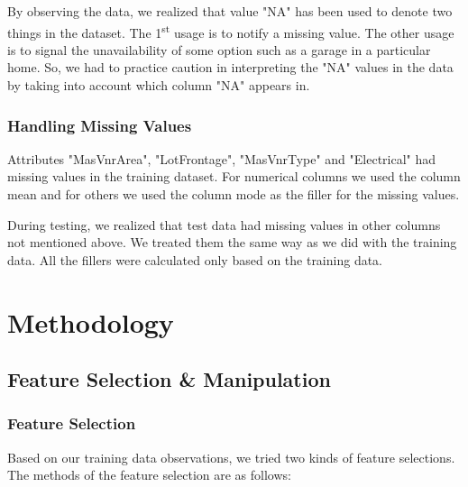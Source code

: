 \documentclass[conference,compsoc]{IEEEtran}
\begin{document}
\par
By observing the data, we realized that value "NA" has been used to denote two things in the dataset. The 1\textsuperscript{st} usage is to notify a missing value. The other usage is to signal the unavailability of some option such as a garage in a particular home. So, we had to practice caution in interpreting the "NA" values in the data by taking into account which column "NA" appears in.

\subsubsection{Handling Missing Values}
\par
Attributes "MasVnrArea", "LotFrontage", "MasVnrType" and "Electrical" had missing values in the training dataset. For numerical columns we used the column mean and for others we used the column mode as the filler for the missing values.

\par
During testing, we realized that test data had missing values in other columns not mentioned above. We treated them the same way as we did with the training data. All the fillers were calculated only based on the training data.

\section{Methodology}
\subsection{Feature Selection \& Manipulation}
\label{sec:feature selection}
\subsubsection{Feature Selection}
\par
Based on our training data observations, we tried two kinds of feature selections. The methods of the feature selection are as follows:
\end{document}
